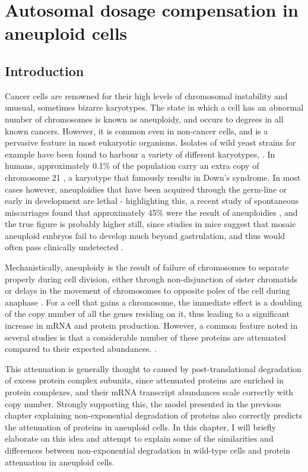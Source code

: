 \documentclass[a4paper,11pt,twoside,openright]{scrbook}
\begin{document}
\chapter{Autosomal dosage compensation in aneuploid cells} \label{chapter:aneuploidy}

\section{Introduction}

Cancer cells are renowned for their high levels of chromosomal instability and unusual, sometimes bizarre karyotypes. The state in which a cell has an abnormal number of chromosomes is known as aneuploidy, and occurs to degrees in all known cancers. However, it is common even in non-cancer cells, and is a pervasive feature in most eukaryotic organisms. Isolates of wild yeast strains for example have been found to harbour a variety of different karyotypes, \cite{Hose2015}. In humans, approximately 0.1\% of the population carry an extra copy of chromosome 21 \cite{Presson2013}, a karyotype that famously results in Down's syndrome. In most cases however, aneuploidies that have been acquired through the germ-line or early in development are lethal - highlighting this, a recent study of spontaneous miscarriages found that approximately 45\% were the result of aneuploidies \cite{Jia2015}, and the true figure is probably higher still, since studies in mice suggest that mosaic aneuploid embryos fail to develop much beyond gastrulation, and thus would often pass clinically undetected \cite{Lightfoot2006}.

Mechanistically, aneuploidy is the result of failure of chromosomes to separate properly during cell division, either through non-disjunction of sister chromatids or delays in the movement of chromosomes to opposite poles of the cell during anaphase \cite{Compton2011}. For a cell that gains a chromosome, the immediate effect is a doubling of the copy number of all the genes residing on it, thus leading to a significant increase in mRNA and protein production. However, a common feature noted in several studies is that a considerable number of these proteins are attenuated compared to their expected abundances. \cite{Stingele2012,Dephoure2014,Goncalves2017}.

This attenuation is generally thought to caused by post-translational degradation of excess protein complex subunits, since attenuated proteins are enriched in protein complexes, and their mRNA transcript abundances scale correctly with copy number. Strongly supporting this, the model presented in the previous chapter explaining non-exponential degradation of proteins also correctly predicts the attenuation of proteins in aneuploid cells. In this chapter, I will briefly elaborate on this idea and attempt to explain some of the similarities and differences between non-exponential degradation in wild-type cells and protein attenuation in aneuploid cells.
\end{document}
